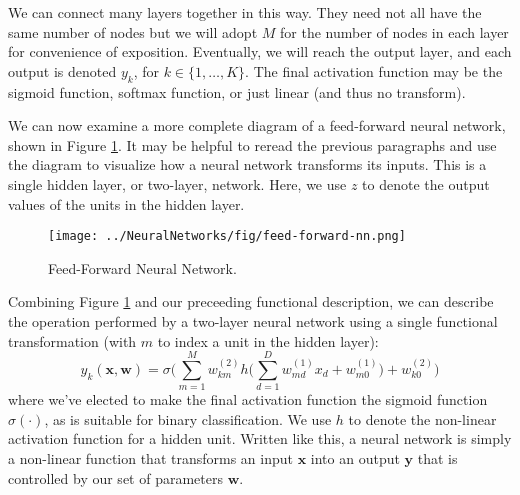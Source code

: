       We can connect many layers together in this way. They need not all have the same number of nodes but we will adopt $M$ for the number of nodes in each layer for convenience of exposition. Eventually, we will reach the output layer, and each output is denoted $y_{k}$, for $k\in \{1,\dots,K\}$.
      The final activation function may be the sigmoid function, softmax function, or  just linear (and thus no transform).
      
We can now examine a more complete diagram of a feed-forward neural network, shown in Figure \ref{fig:feed-foward-nn}. It may be helpful to reread the previous paragraphs and use the diagram to visualize how a neural network transforms its inputs. This is a single hidden layer, or two-layer, network. Here, we use $z$ to denote the output values of the units in the hidden layer.

\begin{figure}
    \centering
    \texttt{[image: ../NeuralNetworks/fig/feed-forward-nn.png]}
    \caption{Feed-Forward Neural Network.}
    \label{fig:feed-foward-nn}
\end{figure}


Combining Figure \ref{fig:feed-foward-nn} and our preceeding functional description, we can describe the operation performed by a two-layer neural network using a single functional transformation (with $m$ to index a unit in the hidden layer):
%
\begin{equation} \label{full-nn-equation}
	y_{k}(\textbf{x}, \textbf{w}) = \sigma\bigg(\sum_{m=1}^{M}w_{km}^{(2)} h\bigg(\sum_{d=1}^{D}w_{md}^{(1)}x_{d} + w_{m0}^{(1)}\bigg) + w_{k0}^{(2)}\bigg)
\end{equation}
where we've elected to make the final activation function the sigmoid function $\sigma(\cdot)$, as is suitable for binary classification.  We use $h$ to denote the non-linear activation function for a hidden unit.
%
Written like this, a neural network is simply a non-linear function that transforms an input $\textbf{x}$ into an output $\textbf{y}$ that is controlled by our set of parameters $\textbf{w}$.


